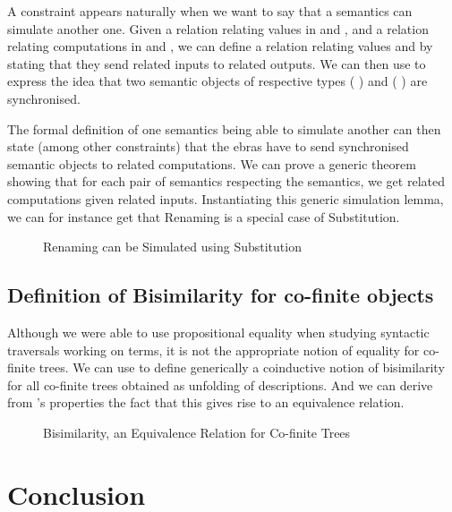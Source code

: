 A  constraint appears naturally when we want to say that a
semantics can simulate another one. Given a relation
relating values in  and , and a relation
relating computations in  and , we can define
a relation  relating values   
and    by stating that they send
related inputs to related outputs. We can then use  to
express the idea that two semantic objects of respective types
   (  ) and
   (  ) are
synchronised.

The formal definition of one semantics being able to simulate another
can then state (among other constraints) that the ebras have
to send synchronised semantic objects to related computations. We can
prove a generic theorem showing that for each pair of semantics respecting
the semantics, we get related computations given related inputs.
Instantiating this generic simulation lemma, we can for instance get
that Renaming is a special case of Substitution.

\begin{figure}[h]
\caption{Renaming can be Simulated using Substitution}
\end{figure}

\subsection{Definition of Bisimilarity for co-finite objects}

Although we were able to use propositional equality when studying
syntactic traversals working on terms, it is not the appropriate
notion of equality for co-finite trees. We can use  to
define generically a coinductive notion of bisimilarity for all
co-finite trees obtained as unfolding of descriptions. And we
can derive from 's properties the fact that this gives
rise to an equivalence relation.

\begin{figure}[h]
\caption{Bisimilarity, an Equivalence Relation for Co-finite Trees}
\end{figure}


\section{Conclusion}


